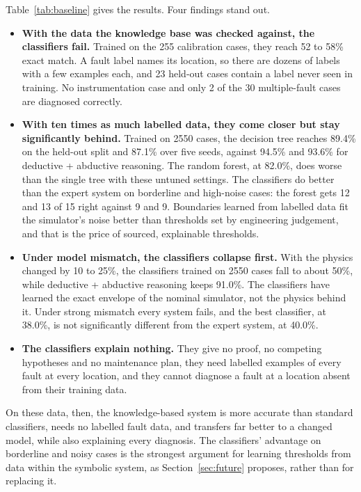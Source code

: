 Table~\ref{tab:baseline} gives the results. Four findings stand out.

\begin{itemize}
  \item \textbf{With the data the knowledge base was checked against, the classifiers fail.} Trained on the 255 calibration cases, they reach 52 to 58\% exact match. A fault label names its location, so there are dozens of labels with a few examples each, and 23 held-out cases contain a label never seen in training. No instrumentation case and only 2 of the 30 multiple-fault cases are diagnosed correctly.
  \item \textbf{With ten times as much labelled data, they come closer but stay significantly behind.} Trained on 2550 cases, the decision tree reaches 89.4\% on the held-out split and 87.1\% over five seeds, against 94.5\% and 93.6\% for deductive + abductive reasoning. The random forest, at 82.0\%, does worse than the single tree with these untuned settings. The classifiers do better than the expert system on borderline and high-noise cases: the forest gets 12 and 13 of 15 right against 9 and 9. Boundaries learned from labelled data fit the simulator's noise better than thresholds set by engineering judgement, and that is the price of sourced, explainable thresholds.
  \item \textbf{Under model mismatch, the classifiers collapse first.} With the physics changed by 10 to 25\%, the classifiers trained on 2550 cases fall to about 50\%, while deductive + abductive reasoning keeps 91.0\%. The classifiers have learned the exact envelope of the nominal simulator, not the physics behind it. Under strong mismatch every system fails, and the best classifier, at 38.0\%, is not significantly different from the expert system, at 40.0\%.
  \item \textbf{The classifiers explain nothing.} They give no proof, no competing hypotheses and no maintenance plan, they need labelled examples of every fault at every location, and they cannot diagnose a fault at a location absent from their training data.
\end{itemize}

On these data, then, the knowledge-based system is more accurate than standard classifiers, needs no labelled fault data, and transfers far better to a changed model, while also explaining every diagnosis. The classifiers' advantage on borderline and noisy cases is the strongest argument for learning thresholds from data within the symbolic system, as Section~\ref{sec:future} proposes, rather than for replacing it.

